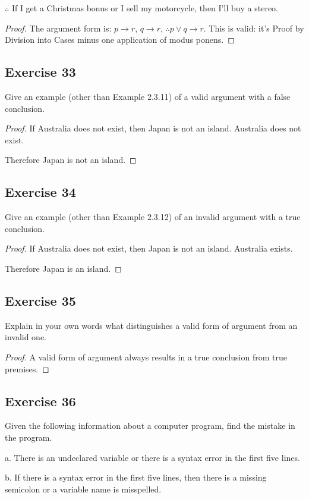 \documentclass[14pt]{extarticle}
\begin{document}
$\therefore$ If I get a Christmas bonus or I sell my motorcycle, then I’ll buy a
stereo.

\begin{proof} The argument form is: $p \to r$, $q \to r$, $\therefore p \vee q
\to r$. This is valid: it's Proof by Division into Cases minus one application
of modus ponens. \end{proof}

\subsection{Exercise 33} Give an example (other than Example 2.3.11) of a valid
argument with a false conclusion.

\begin{proof} If Australia does not exist, then Japan is not an island.
Australia does not exist.

Therefore Japan is not an island. \end{proof}
\subsection{Exercise 34} Give an example (other than Example 2.3.12) of an
invalid argument with a true conclusion.

\begin{proof} If Australia does not exist, then Japan is not an island.
Australia exists.

Therefore Japan is an island. \end{proof}
\subsection{Exercise 35} Explain in your own words what distinguishes a valid
form of argument from an invalid one.

\begin{proof} A valid form of argument always results in a true conclusion from
true premises. \end{proof}

\subsection{Exercise 36} Given the following information about a computer
program, find the mistake in the program.

a. There is an undeclared variable or there is a syntax error in the first five
lines.

b. If there is a syntax error in the first five lines, then there is a missing
semicolon or a variable name is misspelled.
\end{document}
